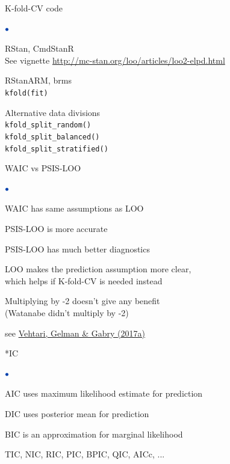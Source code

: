 \documentclass[english,t]{beamer}
\newenvironment{list1}{
   \begin{list}{$\color{list1}\bullet$}{\itemsep=6pt}}{
  \end{list}}
\begin{document}
\begin{frame}{K-fold-CV code}

  \begin{list1}
  \item RStan, CmdStanR\\
    See vignette \url{http://mc-stan.org/loo/articles/loo2-elpd.html}
  \item RStanARM, brms\\
    \texttt{kfold(fit)}
  \item Alternative data divisions\\
  \texttt{kfold\_split\_random()}\\ \vspace{0.2\baselineskip}
  \texttt{kfold\_split\_balanced()}\\ \vspace{0.2\baselineskip}
  \texttt{kfold\_split\_stratified()}
  \end{list1}
  
\end{frame}


\begin{frame}{WAIC vs PSIS-LOO}

\begin{list1}
  \item<2-> WAIC has same assumptions as LOO
  \item<3-> PSIS-LOO is more accurate 
  \item<4-> PSIS-LOO has much better diagnostics
  \item<5-> LOO makes the prediction assumption more clear,\\ which
    helps if K-fold-CV is needed instead
  \item<6-> Multiplying by -2 doesn't give any benefit\\ (Watanabe
    didn't multiply by -2)
\end{list1}

\vspace{6\baselineskip}
{\small see \href{http://link.springer.com/article/10.1007/s11222-016-9696-4}{Vehtari, Gelman \& Gabry (2017a)}}
\end{frame}

\begin{frame}{*IC}

\begin{list1}
  \item AIC uses maximum likelihood estimate for prediction
  \item DIC uses posterior mean for prediction
  \item BIC is an approximation for marginal likelihood
  \item TIC, NIC, RIC, PIC, BPIC, QIC, AICc, ...
\end{list1}

\end{frame}
\end{document}
